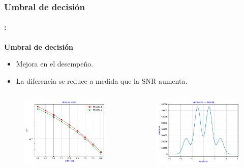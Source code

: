 \begin{frame}
  \frametitle{\textbf{Umbral de decisión}}
\framesubtitle{\secname : \subsecname}
      \begin{block}{\centering \textbf{Umbral de decisión}}
  \begin{itemize}
    \item Mejora en el desempeño.
    \item La diferencia se reduce a medida que la SNR aumenta.  
 \end{itemize}
    \end{block}
\vspace{-0.3cm}
\begin{columns}
    \begin{column}{0.48\paperwidth}
     \begin{figure}
      \centering
      \includegraphics[width=\textwidth]{Graficos/BER_vs_SNR_9.png}%
    \end{figure}
    
    \end{column}
    \begin{column}{0.48\paperwidth}  
    \begin{figure}
        \centering
         \includegraphics[width=\textwidth]{Graficos/Slicer_025.png}
    \end{figure}
   

\end{column}
\end{columns}
\end{frame}
